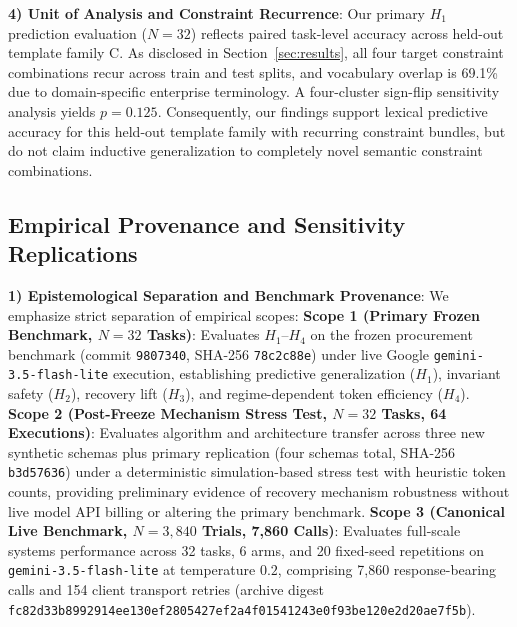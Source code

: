 \noindent\textbf{4) Unit of Analysis and Constraint Recurrence}: Our primary $H_1$ prediction evaluation ($N=32$) reflects paired task-level accuracy across held-out template family C. As disclosed in Section~\ref{sec:results}, all four target constraint combinations recur across train and test splits, and vocabulary overlap is 69.1\% due to domain-specific enterprise terminology. A four-cluster sign-flip sensitivity analysis yields $p = 0.125$. Consequently, our findings support lexical predictive accuracy for this held-out template family with recurring constraint bundles, but do not claim inductive generalization to completely novel semantic constraint combinations.

\subsection{Empirical Provenance and Sensitivity Replications}
\noindent\textbf{1) Epistemological Separation and Benchmark Provenance}: We emphasize strict separation of empirical scopes: \textbf{Scope 1 (Primary Frozen Benchmark, $N=32$ Tasks)}: Evaluates $H_1$--$H_4$ on the frozen procurement benchmark (commit \texttt{9807340}, SHA-256 \texttt{78c2c88e}) under live Google \texttt{gemini-3.5-flash-lite} execution, establishing predictive generalization ($H_1$), invariant safety ($H_2$), recovery lift ($H_3$), and regime-dependent token efficiency ($H_4$). \textbf{Scope 2 (Post-Freeze Mechanism Stress Test, $N=32$ Tasks, 64 Executions)}: Evaluates algorithm and architecture transfer across three new synthetic schemas plus primary replication (four schemas total, SHA-256 \texttt{b3d57636}) under a deterministic simulation-based stress test with heuristic token counts, providing preliminary evidence of recovery mechanism robustness without live model API billing or altering the primary benchmark. \textbf{Scope 3 (Canonical Live Benchmark, $N=3,840$ Trials, 7,860 Calls)}: Evaluates full-scale systems performance across 32 tasks, 6 arms, and 20 fixed-seed repetitions on \texttt{gemini-3.5-flash-lite} at temperature $0.2$, comprising 7,860 response-bearing calls and 154 client transport retries (archive digest \texttt{fc82d33b\allowbreak 8992914e\allowbreak e130ef28\allowbreak 05427ef2\allowbreak a4f01541\allowbreak 243e0f93\allowbreak be120e2d\allowbreak 20ae7f5b}).

